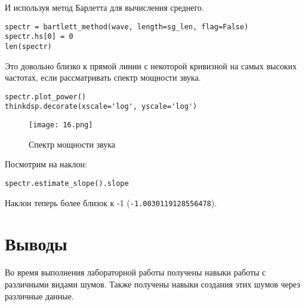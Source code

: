 \documentclass[a4paper,12pt]{report}
\begin{document}
И используя метод Барлетта для вычисления среднего.

\begin{lstlisting}[caption=Использование метода Барлетта]
spectr = bartlett_method(wave, length=sg_len, flag=False)
spectr.hs[0] = 0
len(spectr)
\end{lstlisting}

Это довольно близко к прямой линии с некоторой кривизной на самых высоких частотах, если рассматривать спектр мощности звука.

\begin{lstlisting}[caption=Спектр мощности звука]
spectr.plot_power()
thinkdsp.decorate(xscale='log', yscale='log')
\end{lstlisting}

\begin{figure}[H]
        \centering
        \texttt{[image: 16.png]}
        \caption{Спектр мощности звука}
        \label{fig:lab4_fig5_3}
\end{figure}

Посмотрим на наклон:

\begin{lstlisting}[caption=Наклон прямой]
spectr.estimate_slope().slope
\end{lstlisting}

Наклон теперь более близок к -1 (\texttt{-1.0030119128556478}).

\chapter{Выводы}

Во время выполнения лабораторной работы получены навыки работы с различными видами шумов. Также получены навыки создания этих шумов через различные данные.
\end{document}
